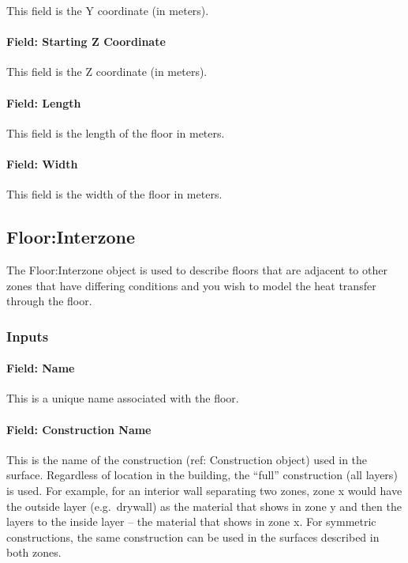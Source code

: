This field is the Y coordinate (in meters).

\paragraph{Field: Starting Z Coordinate}\label{field-starting-z-coordinate-8}

This field is the Z coordinate (in meters).

\paragraph{Field: Length}\label{field-length-8}

This field is the length of the floor in meters.

\paragraph{Field: Width}\label{field-width-4}

This field is the width of the floor in meters.

\subsection{Floor:Interzone}\label{floorinterzone}

The Floor:Interzone object is used to describe floors that are adjacent to other zones that have differing conditions and you wish to model the heat transfer through the floor.

\subsubsection{Inputs}\label{inputs-13-016}

\paragraph{Field: Name}\label{field-name-9-019}

This is a unique name associated with the floor.

\paragraph{Field: Construction Name}\label{field-construction-name-9}

This is the name of the construction (ref: Construction object) used in the surface. Regardless of location in the building, the ``full'' construction (all layers) is used. For example, for an interior wall separating two zones, zone x would have the outside layer (e.g.~drywall) as the material that shows in zone y and then the layers to the inside layer -- the material that shows in zone x. For symmetric constructions, the same construction can be used in the surfaces described in both zones.

